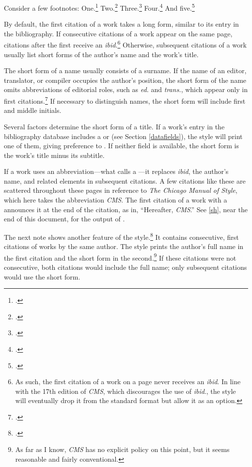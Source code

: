 \documentclass[11pt,letterpaper,oneside]{article}
\begin{document}
Consider a few footnotes: One.\footcite{beattie1974}
Two.\footcite[51]{beattie1974} Three.\footcite[51]{beattie1974}
Four.\footcite[35]{shields2008} And five.\footcite[51]{beattie1974}

By default, the first citation of a work takes a long form, similar to
its entry in the bibliography. If consecutive citations of a work
appear on the same page, citations after the first receive an
\textit{ibid}.\footnote{As such, the first citation of a work on a
page never receives an \textit{ibid}. In line with the 17th edition of
\textit{CMS}, which discourages the use of \textit{ibid}., the style
will eventually drop it from the standard format but allow it as an
option.} Otherwise, subsequent citations of a work usually list short
forms of the author's name and the work's title.

The short form of a name usually consists of a surname. If the name of
an editor, translator, or compiler occupies the author's position, the
short form of the name omits abbreviations of editorial roles, such as
\textit{ed.} and \textit{trans.}, which appear only in first
citations.\footcite[See 14.18, 14.27, 14.76]{chicago2010} If necessary
to distinguish names, the short form will include first and middle
initials.

Several factors determine the short form of a title. If a work's entry
in the bibliography database includes a  or
 (see Section \ref{datafields}), the style
will print one of them, giving preference to . If
neither field is available, the short form is the work's title minus
its subtitle.

If a work uses an abbreviation---what \biblatex calls a
---it replaces \textit{ibid}, the author's name,
and related elements in subsequent citations. A few citations like
these are scattered throughout these pages in reference to \textit{The
Chicago Manual of Style}, which here takes the abbreviation
\textit{CMS}. The first citation of a work with a 
announces it at the end of the citation, as in, ``Hereafter,
\textit{CMS}.'' See \ref{sh}, near the end of this document, for the
output of .

The next note shows another feature of the
style.\footcite{camus1991a,camus1991b} It contains consecutive, first
citations of works by the same author. The style prints the author's
full name in the first citation and the short form in the
second.\footnote{As far as I know, \textit{CMS} has no explicit policy
on this point, but it seems reasonable and fairly conventional.} If
these citations were not consecutive, both citations would include the
full name; only subsequent citations would use the short form.
\end{document}
